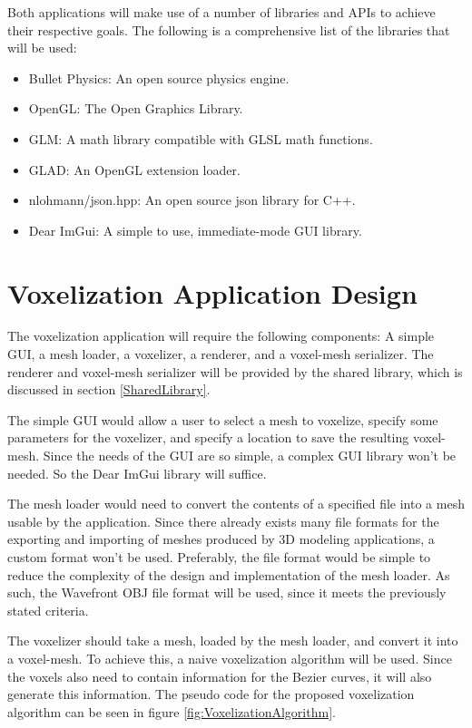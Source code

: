 Both applications will make use of a number of libraries and APIs to achieve their respective goals. 
The following is a comprehensive list of the libraries that will be used:

\begin{itemize}
  \item Bullet Physics: An open source physics engine.
  \item OpenGL: The Open Graphics Library.
  \item GLM: A math library compatible with GLSL math functions.
  \item GLAD: An OpenGL extension loader.
  \item nlohmann/json.hpp: An open source json library for C++.
  \item Dear ImGui: A simple to use, immediate-mode GUI library.
\end{itemize}

\section{Voxelization Application Design}

The voxelization application will require the following components: A simple GUI, a mesh loader,
a voxelizer, a renderer, and a voxel-mesh serializer. The renderer and voxel-mesh serializer will 
be provided by the shared library, which is discussed in section \ref{SharedLibrary}. 

The simple GUI would allow a user to select a mesh to voxelize, specify some parameters for the 
voxelizer, and specify a location to save the resulting voxel-mesh. Since the needs of the GUI are 
so simple, a complex GUI library won't be needed. So the Dear ImGui library will suffice.

The mesh loader would need to convert the contents of a specified file into a mesh usable by the
application. Since there already exists many file formats for the exporting and importing of meshes
produced by 3D modeling applications, a custom format won't be used. Preferably, the file format 
would be simple to reduce the complexity of the design and implementation of the mesh loader. As
such, the Wavefront OBJ file format will be used, since it meets the previously stated criteria.

The voxelizer should take a mesh, loaded by the mesh loader, and convert it into a voxel-mesh. To
achieve this, a naive voxelization algorithm will be used. Since the voxels also need to contain
information for the Bezier curves, it will also generate this information. The pseudo code for the 
proposed voxelization algorithm can be seen in figure \ref{fig:VoxelizationAlgorithm}.

